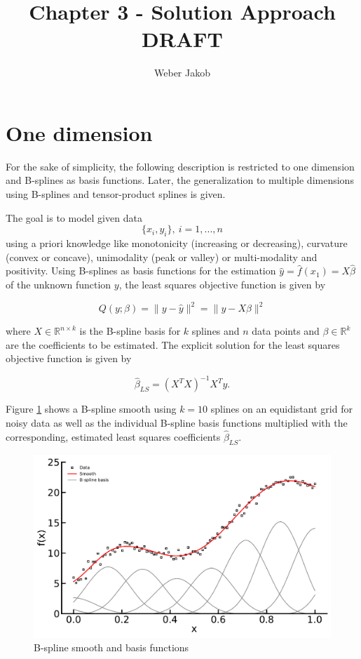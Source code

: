 \documentclass[10pt,a4paper]{article}
\title{Chapter 3 - Solution Approach DRAFT}
\author{Weber Jakob}
\begin{document}
	\maketitle
	
	\section{One dimension} \label{1D}
 	For the sake of simplicity, the following description is restricted to one dimension and B-splines as basis functions. Later, the generalization to multiple dimensions using B-splines and tensor-product splines is given. 
 
 	The goal is to model given data $$\{x_i, y_i\}, \ i = 1, ..., n$$ using a priori knowledge like monotonicity (increasing or decreasing), curvature (convex or concave), unimodality (peak or valley) or multi-modality and positivity. Using B-splines as basis functions for the estimation $\hat y =  \hat f(x_1) = X\hat \beta$ of the unknown function $y$, the least squares objective function is given by
	
	$$Q(y;\beta) = \lVert y - \hat y\rVert^2 = \lVert y - X\beta\rVert^2 $$
	
	where $X \in \mathbb{R}^{n \times k}$ is the B-spline basis for $k$ splines and $n$ data points and $\beta \in \mathbb{R}^k$ are the coefficients to be estimated. The explicit solution for the least squares objective function is given by
	
	$$\hat \beta_{LS}= (X^TX)^{-1}X^T y.$$
	
	Figure \ref{fig:smooth_bf} shows a B-spline smooth using $k=10$ splines on an equidistant grid for noisy data as well as the individual B-spline basis functions multiplied with the corresponding, estimated least squares coefficients $\hat \beta_{LS}$.
	
	\begin{figure}[H]
		\centering
		\includegraphics[width=\columnwidth]{thesisplots/smooth_bf.pdf}
		\caption{B-spline smooth and basis functions}
		\label{fig:smooth_bf}
    \end{figure}
	
\end{document}
